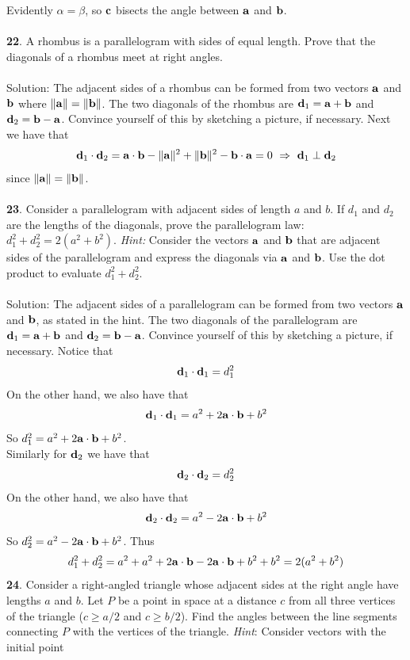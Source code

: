 \documentclass[12pt]{amsbook}
\begin{document}
Evidently $\alpha=\beta$, so $\bf c$ bisects the angle between $\bf a$ and $\bf b$.
\\
\\
{\small\bf 22}. A rhombus is a parallelogram with sides of equal length.
Prove that the diagonals of a rhombus meet at right angles.\\
\\
{\sc Solution}:
The adjacent sides of a rhombus can be formed from two vectors $\bf a$ and $\bf b$ where $\|\bf a\|=\|\bf b\|$. The two diagonals of the rhombus are ${\bf d}_1=\bf a+b$ and ${\bf d}_2=\bf b-a$. Convince yourself of this by sketching a picture, if necessary. Next we have that 
$${\bf d}_1\cdot{\bf d}_2={\bf a}\cdot{\bf b}-\|{\bf a}\|^2+\|{\bf b}\|^2-{\bf b}\cdot{\bf a}=0 \ \Rightarrow \ {\bf d}_1\perp{\bf d}_2$$
since $\|{\bf a}\|=\|{\bf b}\|$.
\\
\\
{\small\bf 23}. Consider a parallelogram with adjacent sides of length
$a$ and $b$. If $d_1$ and $d_2$ are the lengths of the diagonals,
prove the parallelogram law:
$d_1^2+d_2^2=2(a^2+b^2)$. {\it Hint:}
Consider the vectors ${\bf a}$ and ${\bf b}$ that are adjacent
sides of the parallelogram and express the diagonals via ${\bf a}$
and ${\bf b}$. Use the dot product to evaluate $d_1^2+d_2^2$.\\
\\
{\sc Solution}:
The adjacent sides of a parallelogram can be formed from two vectors $\bf a$ and $\bf b$, as stated in the hint. The two diagonals of the parallelogram are ${\bf d}_1=\bf a+b$ and ${\bf d}_2=\bf b-a$. Convince yourself of this by sketching a picture, if necessary. Notice that 
$${\bf d}_1\cdot{\bf d}_1=d_1^2$$
On the other hand, we also have that 
$${\bf d}_1\cdot{\bf d}_1=a^2+2{\bf a}\cdot{\bf b}+b^2$$
So $d_1^2=a^2+2{\bf a}\cdot{\bf b}+b^2$.
\\
Similarly for ${\bf d}_2$ we have that 
$${\bf d}_2\cdot{\bf d}_2=d_2^2$$
On the other hand, we also have that 
$${\bf d}_2\cdot{\bf d}_2=a^2-2{\bf a}\cdot{\bf b}+b^2$$
So $d_2^2=a^2-2{\bf a}\cdot{\bf b}+b^2$. Thus
$$d_1^2+d_2^2=a^2+a^2+2{\bf a}\cdot{\bf b}-2{\bf a}\cdot{\bf b}+b^2+b^2=2(a^2+b^2)$$
{\small\bf 24}. Consider a right-angled triangle whose adjacent sides
at the right angle have lengths $a$ and $b$. Let $P$ be 
a point in space at a distance $c$  from
all three vertices of the triangle 
($c\geq a/2$ and $c\geq b/2$). Find the angles
between the line segments connecting $P$ with the vertices
of the triangle. {\it Hint}: Consider vectors with the initial point
\end{document}

